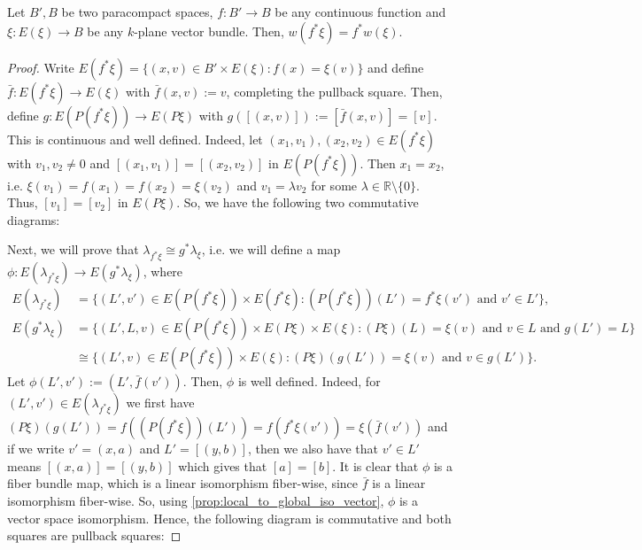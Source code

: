 \begin{proposition} Let $B',B$ be two paracompact spaces, $f:B'\to B$ be any continuous function and $\xi:E(\xi)\to B$ be any $k$-plane vector bundle. Then, $w(f^*\xi)=f^*w(\xi)$.
\end{proposition}
\begin{proof} Write $E(f^*\xi)=\big\{(x,v)\in B'\times E(\xi):f(x)=\xi(v)\big\}$ and define $\bar{f}:E(f^*\xi)\to E(\xi)$ with $\bar{f}(x,v):=v$, completing the pullback square. Then, define $g:E(P(f^*\xi))\to E(P\xi)$ with $g([(x,v)]):=[\bar{f}(x,v)]=[v]$. This is continuous and well defined. Indeed, let $(x_1,v_1),(x_2,v_2)\in E(f^*\xi)$ with $v_1,v_2\neq 0$ and $[(x_1,v_1)]=[(x_2,v_2)]$ in $E(P(f^*\xi))$. Then $x_1=x_2$, i.e. $\xi(v_1)=f(x_1)=f(x_2)=\xi(v_2)$ and $v_1=\lambda v_2$ for some $\lambda\in\mathbb{R}\setminus\{0\}$. Thus, $[v_1]=[v_2]$ in $E(P\xi)$. So, we have the following two commutative diagrams:
\begin{center}
\end{center}
Next, we will prove that $\lambda_{f^*\xi}\cong g^*\lambda_{\xi}$, i.e. we will define a map $\phi:E(\lambda_{f^*\xi})\to E(g^*\lambda_{\xi})$, where
\begin{align*}
E(\lambda_{f^*\xi})&=\big\{(L',v')\in E(P(f^*\xi))\times E(f^*\xi):(P(f^*\xi))(L')=f^*\xi(v')\text{ and }v'\in L'\big\},\\[0.5em]
E(g^*\lambda_{\xi})&=\big\{(L',L,v)\in E(P(f^*\xi))\times E(P\xi)\times E(\xi):(P\xi)(L)=\xi(v)\text{ and }v\in L\text{ and }g(L')=L\big\}\\
&\cong\big\{(L',v)\in E(P(f^*\xi))\times E(\xi):(P\xi)(g(L'))=\xi(v)\text{ and }v\in g(L')\big\}.
\end{align*}
Let $\phi(L',v'):=(L',\bar{f}(v'))$. Then, $\phi$ is well defined. Indeed, for $(L',v')\in E(\lambda_{f^*\xi})$ we first have $(P\xi)(g(L'))=f((P(f^*\xi))(L'))=f(f^*\xi(v'))=\xi(\bar{f}(v'))$ and if we write $v'=(x,a)$ and $L'=[(y,b)]$, then we also have that $v'\in L'$ means $[(x,a)]=[(y,b)]$ which gives that $[a]=[b]$. It is clear that $\phi$ is a fiber bundle map, which is a linear isomorphism fiber-wise, since $\bar{f}$ is a linear isomorphism fiber-wise. So, using \ref{prop:local_to_global_iso_vector}, $\phi$ is a vector space isomorphism. Hence, the following diagram is commutative and both squares are pullback squares:

\end{proof}
